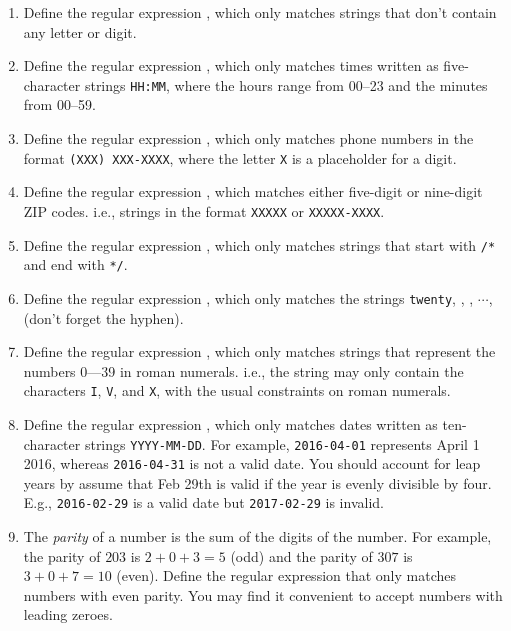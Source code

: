 \begin{enumerate}

  \item Define the regular expression , which only matches strings that don't contain any letter or digit.

  \item Define the regular expression , which only matches times written as five-character strings \texttt{HH:MM}, where the hours range from 00--23 and the minutes from 00--59.

  \item Define the regular expression , which only matches phone numbers in the format \texttt{(XXX) XXX-XXXX}, where the letter \texttt{X} is a placeholder for a digit.

  \item Define the regular expression , which matches either five-digit or nine-digit ZIP codes. i.e., strings in the format \texttt{XXXXX} or \texttt{XXXXX-XXXX}.

  \item Define the regular expression , which only matches strings that start with \texttt{/*} and end with \texttt{*/}.

  \item Define the regular expression , which only matches the strings \texttt{twenty}, , , $\cdots$,  (don't forget the hyphen).

  \item Define the regular expression , which only matches strings that represent the numbers 0---39 in roman numerals. i.e., the string may only contain the characters \texttt{I}, \texttt{V}, and \texttt{X}, with the usual constraints on roman numerals.


  \item Define the regular expression , which only matches dates written as ten-character strings \texttt{YYYY-MM-DD}. For example, \texttt{2016-04-01} represents April 1 2016, whereas \texttt{2016-04-31} is not a valid date. You should account for leap years by assume that Feb 29th is valid if the year is evenly divisible by four. E.g., \texttt{2016-02-29} is a valid date but \texttt{2017-02-29} is invalid.

  \item The \emph{parity} of a number is the sum of the digits of the number. For example, the parity of $203$ is $2 + 0 + 3 = 5$ (odd) and the parity of $307$ is $3 + 0 + 7 = 10$ (even). Define the regular expression  that only matches numbers with even parity. You may find it convenient to accept numbers with leading zeroes.

\end{enumerate}


